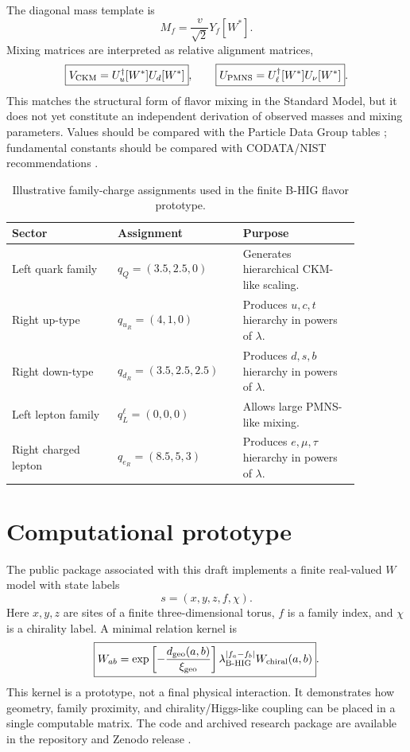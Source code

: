 \documentclass[11pt,a4paper]{article}
\newcommand{\Wstar}{W^{\ast}}
\begin{document}
The diagonal mass template is
\begin{equation}
\boxed{M_f=\frac{v}{\sqrt{2}}Y_f[\Wstar]} .
\label{eq:mass_matrix}
\end{equation}
Mixing matrices are interpreted as relative alignment matrices,
\begin{equation}
\boxed{V_{\rm CKM}=U_u^{\dagger}[\Wstar]U_d[\Wstar]},\qquad
\boxed{U_{\rm PMNS}=U_\ell^{\dagger}[\Wstar]U_\nu[\Wstar]} .
\label{eq:mixing}
\end{equation}
This matches the structural form of flavor mixing in the Standard Model, but it does not yet constitute an independent derivation of observed masses and mixing parameters. Values should be compared with the Particle Data Group tables \cite{PDG2024}; fundamental constants should be compared with CODATA/NIST recommendations \cite{NISTCODATA}.

\begin{table}[ht]
\centering
\caption{Illustrative family-charge assignments used in the finite B-HIG flavor prototype.}
\label{tab:flavor}
\begin{tabular}{p{0.27\linewidth}p{0.30\linewidth}p{0.30\linewidth}}
\toprule
\textbf{Sector} & \textbf{Assignment} & \textbf{Purpose}\\
\midrule
Left quark family & $q_Q=(3.5,2.5,0)$ & Generates hierarchical CKM-like scaling.\\
Right up-type & $q_{u_R}=(4,1,0)$ & Produces $u,c,t$ hierarchy in powers of $\lambda$.\\
Right down-type & $q_{d_R}=(3.5,2.5,2.5)$ & Produces $d,s,b$ hierarchy in powers of $\lambda$.\\
Left lepton family & $q_L^\ell=(0,0,0)$ & Allows large PMNS-like mixing.\\
Right charged lepton & $q_{e_R}=(8.5,5,3)$ & Produces $e,\mu,\tau$ hierarchy in powers of $\lambda$.\\
\bottomrule
\end{tabular}
\end{table}

\section{Computational prototype}
The public package associated with this draft implements a finite real-valued $W$ model with state labels
\begin{equation}
\boxed{s=(x,y,z,f,\chi)} .
\label{eq:state_label}
\end{equation}
Here $x,y,z$ are sites of a finite three-dimensional torus, $f$ is a family index, and $\chi$ is a chirality label. A minimal relation kernel is
\begin{equation}
\boxed{
W_{ab}=\exp\left[-\frac{d_{\rm geo}(a,b)}{\xi_{\rm geo}}\right]
\lambda_{\rm B\text{-}HIG}^{|f_a-f_b|}
W_{\rm chiral}(a,b)
} .
\label{eq:kernel}
\end{equation}
This kernel is a prototype, not a final physical interaction. It demonstrates how geometry, family proximity, and chirality/Higgs-like coupling can be placed in a single computable matrix. The code and archived research package are available in the repository and Zenodo release \cite{Bolat2026GitHub,Bolat2026Zenodo}.
\end{document}
